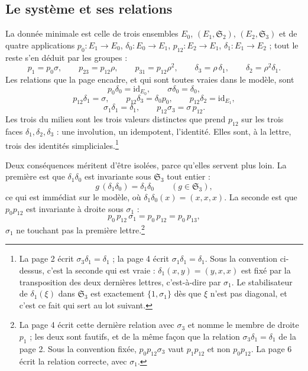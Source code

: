 \documentclass[11pt,a4paper]{article}
\begin{document}
\subsection*{Le système et ses relations}

La donnée minimale est celle de trois ensembles $E_{0}$, $(E_{1},
\mathfrak{S}_{2})$, $(E_{2}, \mathfrak{S}_{3})$ et de quatre applications
$p_{0} \colon E_{1} \to E_{0}$, $\delta_{0} \colon E_{0} \to E_{1}$,
$p_{12} \colon E_{2} \to E_{1}$, $\delta_{1} \colon E_{1} \to E_{2}$ ; tout le
reste s'en déduit par les groupes :
\[
  p_{1} = p_{0}\sigma, \qquad
  p_{23} = p_{12}\rho, \qquad p_{31} = p_{12}\rho^{2}, \qquad
  \delta_{3} = \rho\,\delta_{1}, \qquad \delta_{2} = \rho^{2}\delta_{1}.
\]
Les relations que la page encadre, et qui sont toutes vraies dans le modèle,
sont
\[
  p_{0}\delta_{0} = \mathrm{id}_{E_{0}}, \qquad \sigma\delta_{0} = \delta_{0},
\]
\[
  p_{12}\delta_{1} = \sigma, \qquad
  p_{12}\delta_{3} = \delta_{0}p_{0}, \qquad
  p_{12}\delta_{2} = \mathrm{id}_{E_{1}},
\]
\[
  \sigma_{1}\delta_{1} = \delta_{1}, \qquad
  p_{12}\sigma_{3} = \sigma\,p_{12}.
\]
Les trois du milieu sont les trois valeurs distinctes que prend $p_{12}$ sur
les trois faces $\delta_{1}, \delta_{2}, \delta_{3}$ : une involution, un
idempotent, l'identité. Elles sont, à la lettre, trois des identités
simpliciales.\footnote{La page 2 écrit $\sigma_{3}\delta_{1} = \delta_{1}$ ; la
page 4 écrit $\sigma_{1}\delta_{1} = \delta_{1}$. Sous la convention ci-dessus,
c'est la seconde qui est vraie : $\delta_{1}(x,y) = (y,x,x)$ est fixé par la
transposition des deux dernières lettres, c'est-à-dire par $\sigma_{1}$. Le
stabilisateur de $\delta_{1}(\xi)$ dans $\mathfrak{S}_{3}$ est exactement
$\{1,\sigma_{1}\}$ dès que $\xi$ n'est pas diagonal, et c'est ce fait qui sert
au lot suivant.}

Deux conséquences méritent d'être isolées, parce qu'elles servent plus loin.
La première est que $\delta_{1}\delta_{0}$ est invariante sous $\mathfrak{S}_{3}$
tout entier :
\[
  g\,(\delta_{1}\delta_{0}) = \delta_{1}\delta_{0}
  \qquad (g \in \mathfrak{S}_{3}),
\]
ce qui est immédiat sur le modèle, où $\delta_{1}\delta_{0}(x) = (x,x,x)$. La
seconde est que $p_{0}p_{12}$ est invariante à droite sous $\sigma_{1}$ :
\[
  p_{0}\,p_{12}\,\sigma_{1} = p_{0}\,p_{12} = p_{0}\,p_{13},
\]
$\sigma_{1}$ ne touchant pas la première lettre.\footnote{La page 4 écrit cette
dernière relation avec $\sigma_{3}$ et nomme le membre de droite $p_{1}$ ; les
deux sont fautifs, et de la même façon que la relation
$\sigma_{3}\delta_{1} = \delta_{1}$ de la page 2. Sous la convention fixée,
$p_{0}p_{12}\sigma_{3}$ vaut $p_{1}p_{12}$ et non $p_{0}p_{12}$. La page 6
écrit la relation correcte, avec $\sigma_{1}$.}
\end{document}
